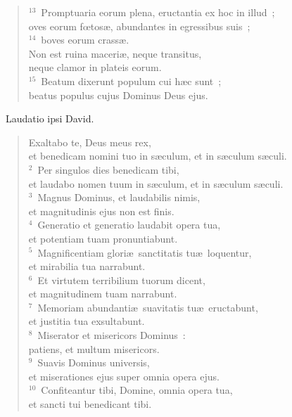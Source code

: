\begin{flushleft}
\begin{verse}
${}^{13}$~Promptuaria eorum plena, eructantia ex hoc in illud~;\\ oves eorum fœtos\ae , abundantes in egressibus suis~;\\
${}^{14}$~boves eorum crass\ae .\\ Non est ruina maceri\ae , neque transitus,\\ neque clamor in plateis eorum.\\
${}^{15}$~Beatum dixerunt populum cui h\ae c sunt~;\\ beatus populus cujus Dominus Deus ejus.\end{verse}\end{flushleft}


~\lettrine[lines=10,image=true,loversize=0.05,lraise=-0.03]{L}{}audatio ipsi David. \begin{flushleft}\begin{verse}\vspace{6pt}Exaltabo te, Deus meus rex,\\ et benedicam nomini tuo in s\ae culum, et in s\ae culum s\ae culi.\\
${}^{2}$~Per singulos dies benedicam tibi,\\ et laudabo nomen tuum in s\ae culum, et in s\ae culum s\ae culi.\\
${}^{3}$~Magnus Dominus, et laudabilis nimis,\\ et magnitudinis ejus non est finis.\\
${}^{4}$~Generatio et generatio laudabit opera tua,\\ et potentiam tuam pronuntiabunt.\\
${}^{5}$~Magnificentiam glori\ae\ sanctitatis tu\ae\ loquentur,\\ et mirabilia tua narrabunt.\\
${}^{6}$~Et virtutem terribilium tuorum dicent,\\ et magnitudinem tuam narrabunt.\\
${}^{7}$~Memoriam abundanti\ae\ suavitatis tu\ae\ eructabunt,\\ et justitia tua exsultabunt.\\
${}^{8}$~Miserator et misericors Dominus~:\\ patiens, et multum misericors.\\
${}^{9}$~Suavis Dominus universis,\\ et miserationes ejus super omnia opera ejus.\\
${}^{10}$~Confiteantur tibi, Domine, omnia opera tua,\\ et sancti tui benedicant tibi.\\

\end{verse}
\end{flushleft}
